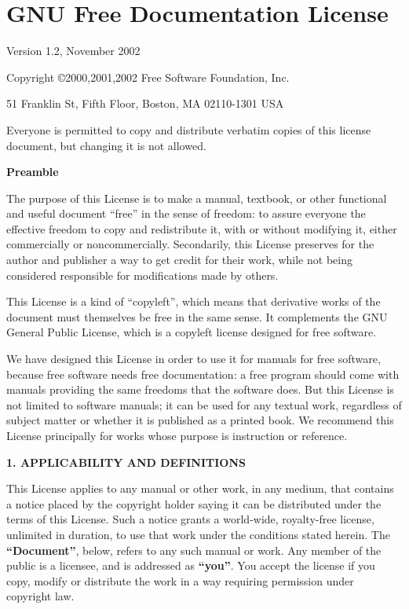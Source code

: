 \documentclass[a4paper,12pt,english]{sphinxmanual}
\begin{document}
\chapter{GNU Free Documentation License}
\label{fdl::doc}\label{fdl:gnu-free-documentation-license}
Version 1.2, November 2002

Copyright ©2000,2001,2002 Free Software Foundation, Inc.

51 Franklin St, Fifth Floor, Boston, MA 02110-1301 USA

Everyone is permitted to copy and distribute verbatim copies of this
license document, but changing it is not allowed.

\textbf{Preamble}

The purpose of this License is to make a manual, textbook, or other
functional and useful document ``free'' in the sense of freedom: to assure
everyone the effective freedom to copy and redistribute it, with or
without modifying it, either commercially or noncommercially.
Secondarily, this License preserves for the author and publisher a way
to get credit for their work, while not being considered responsible for
modifications made by others.

This License is a kind of ``copyleft'', which means that derivative works
of the document must themselves be free in the same sense. It
complements the GNU General Public License, which is a copyleft license
designed for free software.

We have designed this License in order to use it for manuals for free
software, because free software needs free documentation: a free program
should come with manuals providing the same freedoms that the software
does. But this License is not limited to software manuals; it can be
used for any textual work, regardless of subject matter or whether it is
published as a printed book. We recommend this License principally for
works whose purpose is instruction or reference.

\textbf{1. APPLICABILITY AND DEFINITIONS}

This License applies to any manual or other work, in any medium, that
contains a notice placed by the copyright holder saying it can be
distributed under the terms of this License. Such a notice grants a
world-wide, royalty-free license, unlimited in duration, to use that
work under the conditions stated herein. The \textbf{``Document''}, below,
refers to any such manual or work. Any member of the public is a
licensee, and is addressed as \textbf{``you''}. You accept the license if you
copy, modify or distribute the work in a way requiring permission under
copyright law.
\end{document}
